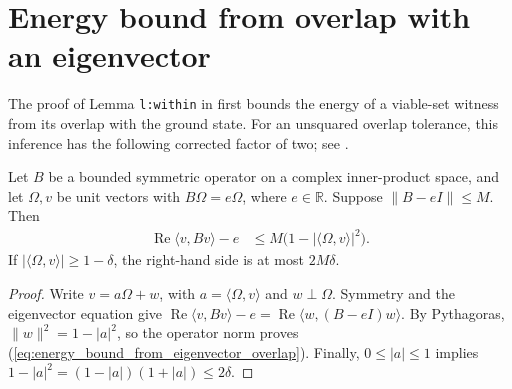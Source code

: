 \section{Energy bound from overlap with an eigenvector}

The proof of Lemma \texttt{l:within} in
\cite[source lines 509--515]{Landau2013PolynomialTime} first bounds the energy
of a viable-set witness from its overlap with the ground state. For an
unsquared overlap tolerance, this inference has the following corrected
factor of two; see \cite{gap:lvv13_witness_energy}.

\begin{theorem}
    \label{thm:energy_bound_from_eigenvector_overlap}
    \leanok
    Let $B$ be a bounded symmetric operator on a complex inner-product space,
    and let $\Omega,v$ be unit vectors with $B\Omega=e\Omega$, where
    $e\in\mathbb R$. Suppose $\|B-eI\|\le M$. Then
    \begin{align}
        \operatorname{Re}\langle v,Bv\rangle-e
         & \le M\bigl(1-|\langle\Omega,v\rangle|^2\bigr).
        \label{eq:energy_bound_from_eigenvector_overlap}
    \end{align}
    If $|\langle\Omega,v\rangle|\ge1-\delta$, the right-hand
    side is at most $2M\delta$.
\end{theorem}

\begin{proof}\leanok
    Write $v=a\Omega+w$, with $a=\langle\Omega,v\rangle$ and $w\perp\Omega$.
    Symmetry and the eigenvector equation give
    $\operatorname{Re}\langle v,Bv\rangle-e
        =\operatorname{Re}\langle w,(B-eI)w\rangle$.
    By Pythagoras, $\|w\|^2=1-|a|^2$, so the operator norm proves
    (\ref{eq:energy_bound_from_eigenvector_overlap}). Finally,
    $0\le|a|\le1$ implies $1-|a|^2=(1-|a|)(1+|a|)\le2\delta$.
\end{proof}
